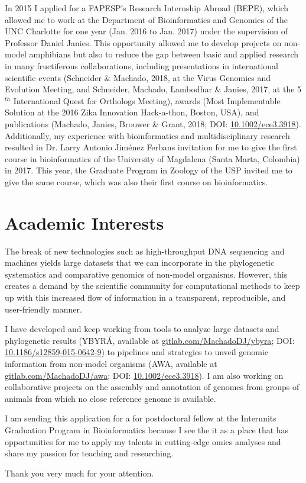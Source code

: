 \documentclass[12pt, a4paper, roman, twoside]{moderncv}        %
\begin{document}
{	In 2015 I applied for a FAPESP's Research Internship Abroad (BEPE), which allowed me to work at the Department of Bioinformatics and Genomics of the UNC Charlotte for one year (Jan. 2016 to Jan. 2017) under the supervision of Professor Daniel Janies. This opportunity allowed me to develop projects on non-model amphibians but also to reduce the gap between basic and applied research in many fructiferous collaborations, including presentations in international scientific events (Schneider \& Machado, 2018, at the Virus Genomics and Evolution Meeting, and Schneider, Machado, Lambodhar \& Janies, 2017, at the 5$^{th}$ International Quest for Orthologs Meeting), awards (Most Implementable Solution at the 2016 Zika Innovation Hack-a-thon, Boston, USA), and publications (Machado, Janies, Brouwer \& Grant, 2018; DOI: \href{https://www.ncbi.nlm.nih.gov/pubmed/29721275}{10.1002/ece3.3918}). Additionally, my experience with bioinformatics and multidisciplinary research resulted in Dr. Larry Antonio Jiménez Ferbans invitation for me to give the first course in bioinformatics of the University of Magdalena (Santa Marta, Colombia) in 2017. This year, the Graduate Program in Zoology of the USP invited me to give the same course, which was also their first course on bioinformatics.
	}
%
\section{Academic Interests}{\setlength{\parindent}{5ex}
    The break of new technologies such as high-throughput DNA sequencing and machines yields large datasets that we can incorporate in the phylogenetic systematics and comparative genomics of non-model organisms. However, this creates a demand by the scientific community for computational methods to keep up with this increased flow of information in a transparent, reproducible, and user-friendly manner.
    
	I have developed and keep working from tools to analyze large datasets and phylogenetic results (YBYRÁ, available at \href{https://gitlab.com/MachadoDJ/ybyra}{gitlab.com/MachadoDJ/ybyra}; DOI: \href{https://bmcbioinformatics.biomedcentral.com/articles/10.1186/s12859-015-0642-9}{10.1186/s12859-015-0642-9}) to pipelines and strategies to unveil genomic information from non-model organisms (AWA, available at \href{https://gitlab.com/MachadoDJ/awa}{gitlab.com/MachadoDJ/awa}; DOI: \href{https://www.ncbi.nlm.nih.gov/pubmed/29721275}{10.1002/ece3.3918}). I am also working on collaborative projects on the assembly and annotation of genomes from groups of animals from which no close reference genome is available.
	
	I am sending this application for a for postdoctoral fellow
at the Interunits Graduation Program in Bioinformatics because I see the it as a place that has opportunities for me to apply my talents in cutting-edge omics analyses and share my passion for teaching and researching.
    }
%
\vspace{2em}

Thank you very much for your attention.

\vspace{1em}
%
\makeletterclosing
%
\end{document}
